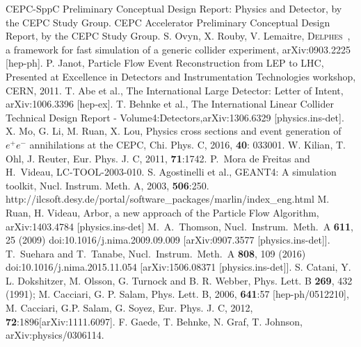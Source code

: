 \documentclass[a4paper,10pt,twoside]{cpc-hepnp}
\begin{document}
\begin{multicols}{2}
\begin{thebibliography}{90}

\vspace{3mm}

CEPC-SppC Preliminary Conceptual Design Report: Physics and Detector, by the CEPC Study Group.
CEPC Accelerator Preliminary Conceptual Design Report, by the CEPC Study Group.
S. Ovyn, X. Rouby,  V. Lemaitre, {\textsc{Delphes}~}, a framework for fast simulation of a generic collider experiment, arXiv:0903.2225 [hep-ph].
P. Janot, Particle Flow Event Reconstruction from LEP to LHC, Presented at Excellence in Detectors and Instrumentation Technologies workshop, CERN, 2011.
T. Abe et al., The International Large Detector: Letter of Intent, arXiv:1006.3396 [hep-ex].
T. Behnke et al., The International Linear Collider Technical Design Report - Volume4:Detectors,arXiv:1306.6329 [physics.ins-det].
X. Mo, G. Li, M. Ruan, X. Lou, Physics cross sections and event generation of $e^+e^-$ annihilations at the CEPC, Chi. Phys. C, 2016, {\bf 40}: 033001.
W. Kilian, T. Ohl, J. Reuter, Eur. Phys. J. C, 2011, {\bf 71}:1742.
  P.~Mora de Freitas and H.~Videau, LC-TOOL-2003-010.
S. Agostinelli et al., GEANT4: A simulation toolkit, Nucl. Instrum. Meth. A, 2003, {\bf 506}:250.
 http://ilcsoft.desy.de/portal/software\_packages/marlin/index\_eng.html
M. Ruan, H. Videau, Arbor, a new approach of the Particle Flow Algorithm, arXiv:1403.4784 [physics.ins-det]
  M.~A.~Thomson,
  Nucl.\ Instrum.\ Meth.\ A {\bf 611}, 25 (2009)
  doi:10.1016/j.nima.2009.09.009
  [arXiv:0907.3577 [physics.ins-det]].
  T.~Suehara and T.~Tanabe,
  Nucl.\ Instrum.\ Meth.\ A {\bf 808}, 109 (2016)
  doi:10.1016/j.nima.2015.11.054
  [arXiv:1506.08371 [physics.ins-det]].
 S. Catani, Y. L. Dokshitzer, M. Olsson, G. Turnock and B. R. Webber, Phys. Lett. B {\bf 269}, 432 (1991);
M. Cacciari, G. P. Salam, Phys. Lett. B, 2006, {\bf 641}:57 [hep-ph/0512210], M. Cacciari, G.P. Salam, G. Soyez, Eur. Phys. J. C, 2012, {\bf 72}:1896[arXiv:1111.6097].
F. Gaede, T. Behnke, N. Graf, T. Johnson, arXiv:physics/0306114.

\end{thebibliography}
\end{multicols}

\clearpage
\end{document}
